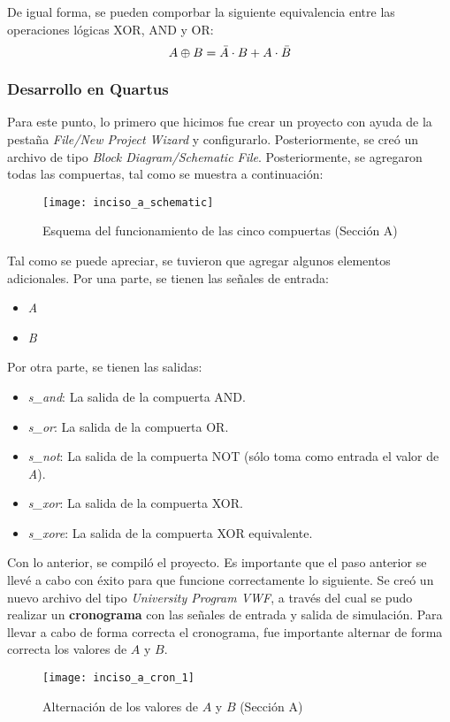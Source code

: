 \documentclass[../procedimientos.tex]{subfiles}
\begin{document}
De igual forma, se pueden comporbar la siguiente equivalencia entre las 
operaciones lógicas XOR, AND y OR:
\begin{equation}
  A \oplus B = \bar{A} \cdot B + A \cdot \bar{B}
\end{equation}

\subsubsection{Desarrollo en Quartus}
Para este punto, lo primero que hicimos fue crear un proyecto con ayuda de la 
pestaña \textit{File/New Project Wizard} y configurarlo. Posteriormente, se 
creó un archivo de tipo \textit{Block Diagram/Schematic File}. Posteriormente, 
se agregaron todas las compuertas, tal como se muestra a continuación:
\begin{figure}[H]
  \centering
  \texttt{[image: inciso\_a\_schematic]}
  \caption{Esquema del funcionamiento de las cinco compuertas (Sección A)}
\end{figure}

Tal como se puede apreciar, se tuvieron que agregar algunos elementos 
adicionales. Por una parte, se tienen las señales de entrada:
\begin{itemize}
  \item \textit{A}
  \item \textit{B}
\end{itemize}

Por otra parte, se tienen las salidas:
\begin{itemize}
  \item \textit{s\_and}: La salida de la compuerta AND.
  \item \textit{s\_or}: La salida de la compuerta OR.
  \item \textit{s\_not}: La salida de la compuerta NOT (sólo toma como entrada 
    el valor de \textit{A}).
  \item \textit{s\_xor}: La salida de la compuerta XOR.
  \item \textit{s\_xore}: La salida de la compuerta XOR equivalente.
\end{itemize}

Con lo anterior, se compiló el proyecto. Es importante que el paso anterior se 
llevé a cabo con éxito para que funcione correctamente lo siguiente. Se creó 
un nuevo archivo del tipo \textit{University Program VWF}, a través del cual 
se pudo realizar un \textbf{cronograma} con las señales de entrada y salida de 
simulación. Para llevar a cabo de forma correcta el cronograma, fue importante 
alternar de forma correcta los valores de $A$ y $B$.
\begin{figure}[H]
  \centering
  \texttt{[image: inciso\_a\_cron\_1]}
  \caption{Alternación de los valores de $A$ y $B$ (Sección A)}
  \label{fig:variables_cron_a}
\end{figure}
\end{document}
